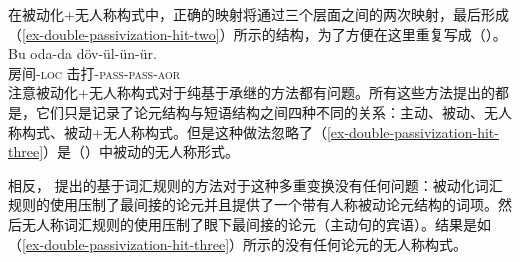 \begin{exe}
\begin{xlist}[iv.]
\begin{exe}
\begin{xlist}[iv.]
\noindent
在被动化+无人称构式中，正确的映射将通过三个层面之间的两次映射，最后形成（\ref{ex-double-passivization-hit-two}）所示的结构，为了方便在这里重复写成（）。 
\ea
\label{ex-double-passivization-hit-three}
\gll Bu oda-da döv-ül-ün-ür.\\
      房间-\textsc{loc} 击打-\textsc{pass}-\textsc{pass}-\textsc{aor}\\
\z
注意被动化+无人称构式对于纯基于承继的方法都有问题。所有这些方法提出的都是，它们只是记录了论元结构与短语结构之间四种不同的关系：主动、被动、无人称构式、被动+无人称构式。但是这种做法忽略了（\ref{ex-double-passivization-hit-three}）是（）中被动的无人称形式。

相反， \citet{Mueller2003e}提出的基于词汇规则的方法对于这种多重变换没有任何问题：被动化词汇规则的使用压制了最间接的论元并且提供了一个带有人称被动论元结构的词项。然后无人称词汇规则的使用压制了眼下最间接的论元（主动句的宾语）。结果是如（\ref{ex-double-passivization-hit-three}）所示的没有任何论元的无人称构式。


\end{xlist}
\end{exe}
\end{xlist}
\end{exe}

